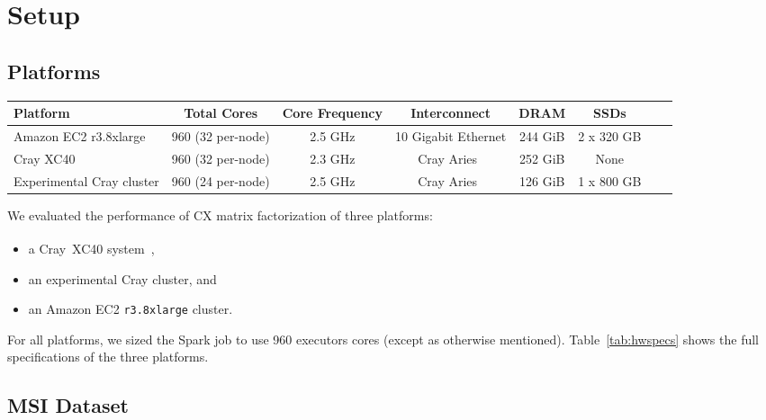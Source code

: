 \section{Setup}
\label{sec:setup}

\subsection{Platforms}

  \begin{table*}
    \begin{center}
    \begin{tabular}{| l | c | c | c | c | c | c | c |}
    \toprule
    \textbf{Platform} & \textbf{Total Cores} & \textbf{Core Frequency} & \textbf{Interconnect} & \textbf{DRAM} & \textbf{SSDs} \\
    \midrule
    Amazon EC2 r3.8xlarge & 960 (32 per-node) & 2.5 GHz & 10 Gigabit Ethernet & 244 GiB & 2 x 320 GB \\
    \midrule
    Cray XC40 & 960 (32 per-node) & 2.3 GHz & Cray Aries~\cite{alverson2012cray,craycascadesc12} & 252 GiB & None \\
    \midrule
    Experimental Cray cluster & 960 (24 per-node) & 2.5 GHz & Cray Aries~\cite{alverson2012cray,craycascadesc12} & 126 GiB & 1 x 800 GB \\
    \bottomrule
    \end{tabular}
    \end{center}
    \caption{Specifications of the three hardware platforms used in these performance experiments.}
    \label{tab:hwspecs}
  \end{table*}
  
 We evaluated the performance of CX matrix factorization of three platforms:
 \begin{itemize}
 \item a Cray\textregistered~XC40\textsuperscript{\tiny\texttrademark} 
 system~\cite{alverson2012cray,craycascadesc12},
 \item an experimental Cray cluster, and
 \item an Amazon EC2 \texttt{r3.8xlarge} cluster.
 \end{itemize}
 For all platforms, we sized the Spark job to use 960 executors cores (except as otherwise mentioned).  Table~\ref{tab:hwspecs} shows the full specifications of the three platforms.
  
\subsection{MSI Dataset}

